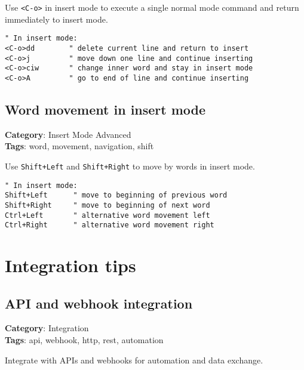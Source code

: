 {{{{{{Use {\footnotesize \Verb§<C-o>§} in insert mode to execute a single normal mode command and return immediately to insert mode.

\begin{Exa*}{}
\begin{Verbatim}[fontsize=\footnotesize, breaklines, breakanywhere]
" In insert mode:
<C-o>dd        " delete current line and return to insert
<C-o>j         " move down one line and continue inserting
<C-o>ciw       " change inner word and stay in insert mode
<C-o>A         " go to end of line and continue inserting
\end{Verbatim}
\end{Exa*}

\section{Word movement in insert mode}

\textbf{Category}: Insert Mode Advanced\\ \textbf{Tags}: word, movement, navigation, shift
\vspace{0.5cm}

Use {\footnotesize \Verb§Shift+Left§} and {\footnotesize \Verb§Shift+Right§} to move by words in insert mode.

\begin{Exa*}{}
\begin{Verbatim}[fontsize=\footnotesize, breaklines, breakanywhere]
" In insert mode:
Shift+Left      " move to beginning of previous word
Shift+Right     " move to beginning of next word
Ctrl+Left       " alternative word movement left
Ctrl+Right      " alternative word movement right
\end{Verbatim}
\end{Exa*}

\chapter{Integration tips}
\section{API and webhook integration}

\textbf{Category}: Integration\\ \textbf{Tags}: api, webhook, http, rest, automation
\vspace{0.5cm}

Integrate with APIs and webhooks for automation and data exchange.

}}}}}}
